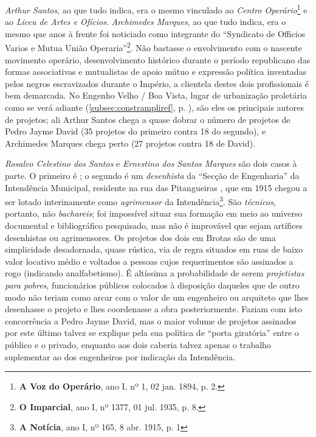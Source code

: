 \textit{Arthur Santos}, ao que tudo indica, era o mesmo vinculado ao \textit{Centro Operário}\footnote{\textbf{A Voz do Operário}, ano I, nº 1, 02 jan. 1894, p. 2.} e ao \textit{Liceu de Artes e Ofícios}. \textit{Archimedes Marques}, ao que tudo indica, era o mesmo que anos à frente foi noticiado como integrante do ``Syndicato de Officios Varios e Mutua União Operaria''\footnote{\textbf{O Imparcial}, ano I, nº 1377, 01 jul. 1935, p. 8.}. Não bastasse o envolvimento com o nascente movimento operário, desenvolvimento histórico durante o período republicano das formas associativas e mutualistas de apoio mútuo e expressão política inventadas pelos negros escravizados durante o Império, a clientela destes dois profissionais é bem demarcada. No Engenho Velho / Boa Vista, lugar de urbanização proletária como se verá adiante (\autoref{subsec:constrampliref}, p. \pageref{subsec:constrampliref}), são eles os principais autores de projetos; ali Arthur Santos chega a quase dobrar o número de projetos de Pedro Jayme David (35 projetos do primeiro contra 18 do segundo), e Archimedes Marques chega perto (27 projetos contra 18 de David).

\textit{Rosalvo Celestino dos Santos} e \textit{Ernestino dos Santos Marques} são dois casos à parte. O primeiro é ; o segundo é um \textit{desenhista} da ``Secção de Engenharia'' da Intendência Municipal, residente na rua das Pitangueiras \cite[p.~279]{reis_almanak_1898}, que em 1915 chegou a ser lotado interinamente como \textit{agrimensor} da Intendência\footnote{\textbf{A Notícia}, ano I, nº 165, 8 abr. 1915, p. 1}. São \textit{técnicos}, portanto, não \textit{bachareis}; foi impossível situar sua formação em meio ao universo documental e bibliográfico pesquisado, mas não é improvável que sejam artífices desenhistas ou agrimensores. Os projetos dos dois em Brotas são de uma simplicidade desadornada, quase rústica, via de regra situados em ruas de baixo valor locativo médio e voltados a pessoas cujos requerimentos são assinados a rogo (indicando analfabetismo). É altíssima a probabilidade de serem \textit{projetistas para pobres}, funcionários públicos colocados à disposição daqueles que de outro modo não teriam como arcar com o valor de um engenheiro ou arquiteto que lhes desenhasse o projeto e lhes coordenasse a obra posteriormente. Faziam com isto concorrência a Pedro Jayme David, mas o maior volume de projetos assinados por este último talvez se explique pela sua política de ``porta giratória'' entre o público e o privado, enquanto aos dois caberia talvez apenas o trabalho suplementar ao dos engenheiros por indicação da Intendência.

